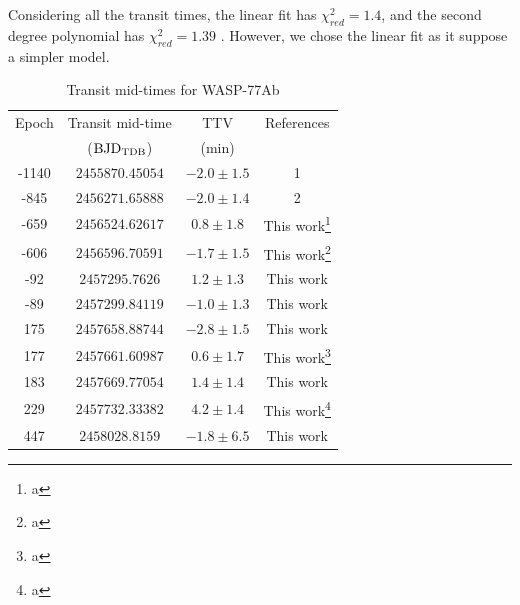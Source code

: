 Considering all the transit times, the linear fit has $\chi^{2}_{red}=1.4$, and the second degree polynomial has $\chi^{2}_{red}=1.39$ . However, we chose the linear fit as it suppose a simpler model.

\begin{table}
\caption{Transit mid-times for WASP-77Ab}
\label{times_wasp77}
\centering
\begin{tabular}{cccc}
\hline \hline
Epoch & Transit mid-time & TTV & References\\
      & (${\rm BJD_{TDB}}$) & (min) &  \\
\hline
-1140 & $2455870.45054$ & $-2.0\pm1.5$ & 1 \\
-845 & $2456271.65888$ & $-2.0\pm1.4$ & 2 \\
-659 & $2456524.62617$ & $0.8\pm1.8$ & This work\footnote{a} \\
-606 & $2456596.70591$ & $-1.7\pm1.5$  & This work\footnote{a}  \\
-92 & $2457295.7626$  & $1.2\pm1.3$& This work \\
-89 & $2457299.84119$ &  $-1.0\pm1.3$ & This work \\
175 & $2457658.88744$ & $-2.8\pm1.5$ & This work\\
177 & $2457661.60987$   & $0.6\pm1.7$ & This work\footnote{a} \\
183 & $2457669.77054$ &  $1.4\pm1.4$  & This work  \\
229 & $2457732.33382$ & $4.2\pm1.4$& This work\footnote{a} \\
447 & $2458028.8159$  & $-1.8\pm6.5$ & This work\\ 
\hline
\end{tabular}
\end{table}

